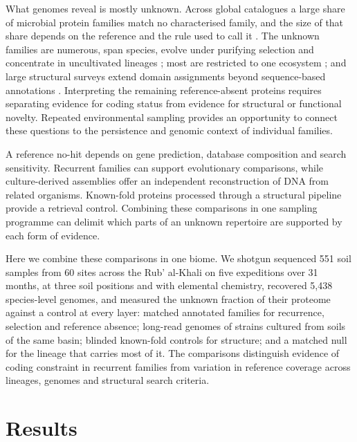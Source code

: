 \documentclass[11pt]{article}
\begin{document}
What genomes reveal is mostly unknown. Across global catalogues a large share of microbial protein
families match no characterised family, and the size of that share depends on the reference and
the rule used to call it \citep{pavlopoulos2023darkmatter,vanni2022agnostos,coelho2022gmgc}. The
unknown families are numerous, span species, evolve under purifying selection and concentrate in
uncultivated lineages \citep{rodriguezdelrio2024fesnov}; most are restricted to one ecosystem
\citep{aplakidou2025quadrupling}; and large structural surveys extend domain assignments beyond sequence-based annotations
\citep{lau2024ted,yeo2025afesm}. Interpreting the remaining reference-absent proteins requires
separating evidence for coding status from evidence for structural or functional novelty.
Repeated environmental sampling provides an opportunity to connect these questions to the
persistence and genomic context of individual families.

A reference no-hit depends on gene prediction, database composition and search sensitivity.
Recurrent families can support evolutionary comparisons, while culture-derived assemblies offer
an independent reconstruction of DNA from related organisms. Known-fold proteins processed
through a structural pipeline provide a retrieval control. Combining these comparisons in one
sampling programme can delimit which parts of an unknown repertoire are supported by each
form of evidence.

Here we combine these comparisons in one biome. We shotgun sequenced 551 soil samples from 60 sites across
the Rub' al-Khali on five expeditions over 31 months, at three soil positions and with elemental
chemistry, recovered 5{,}438 species-level genomes, and measured the unknown fraction of their
proteome against a control at every layer: matched annotated families for recurrence, selection and
reference absence; long-read genomes of strains cultured from soils of the same basin; blinded
known-fold controls for structure; and a matched null for the lineage that carries most of it. The
comparisons distinguish evidence of coding constraint in recurrent families from variation in
reference coverage across lineages, genomes and structural search criteria.

\section*{Results}
\end{document}
